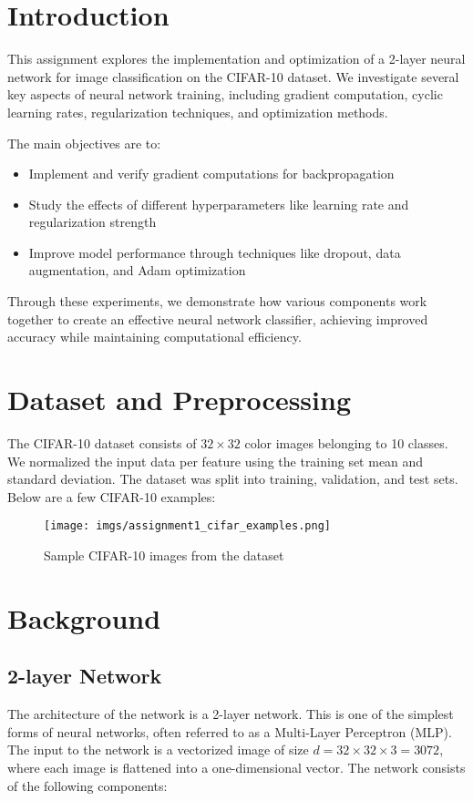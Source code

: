 \documentclass{article}
\begin{document}
\section{Introduction}
This assignment explores the implementation and optimization of a 2-layer neural network for image classification on the CIFAR-10 dataset. We investigate several key aspects of neural network training, including gradient computation, cyclic learning rates, regularization techniques, and optimization methods.

The main objectives are to:
\begin{itemize}
    \item Implement and verify gradient computations for backpropagation
    \item Study the effects of different hyperparameters like learning rate and regularization strength
    \item Improve model performance through techniques like dropout, data augmentation, and Adam optimization
\end{itemize}

Through these experiments, we demonstrate how various components work together to create an effective neural network classifier, achieving improved accuracy while maintaining computational efficiency.



\section{Dataset and Preprocessing}
The CIFAR-10 dataset consists of $32\times32$ color images belonging to 10 classes. We normalized the input data per feature using the training set mean and standard deviation. The dataset was split into training, validation, and test sets. Below are a few CIFAR-10 examples:

\begin{figure}[h!]
    \centering
    \texttt{[image: imgs/assignment1\_cifar\_examples.png]}
    \caption{Sample CIFAR-10 images from the dataset}
\end{figure}

\section{Background}

\subsection{2-layer Network}
The architecture of the network is a 2-layer network. This is one of the simplest forms of neural networks, often referred to as a Multi-Layer Perceptron (MLP). The input to the network is a vectorized image of size $d = 32 \times 32 \times 3 = 3072$, where each image is flattened into a one-dimensional vector. The network consists of the following components:
\end{document}
